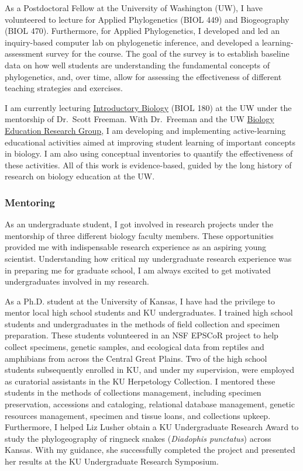 As a Postdoctoral Fellow at the University of Washington (UW), I have
volunteered to lecture for Applied Phylogenetics (BIOL 449) and Biogeography
(BIOL 470).
Furthermore, for Applied Phylogenetics, I developed and led an inquiry-based
computer lab on phylogenetic inference, and developed a learning-assessment
survey for the course.
The goal of the survey is to establish baseline data on how well students are
understanding the fundamental concepts of phylogenetics, and, over time, allow
for assessing the effectiveness of different teaching strategies and exercises.

I am currently lecturing
\href{http://courses.biology.washington.edu/biol180/}{Introductory Biology}
(BIOL 180) at the UW under the mentorship of Dr.\ Scott Freeman.
With Dr.\ Freeman and the UW \href{http://uw-berg.wikifoundry.com/}{Biology
    Education Research Group}, I am developing and implementing active-learning
educational activities aimed at improving student learning of important
concepts in biology.
I am also using conceptual inventories to quantify the effectiveness of these
activities.
All of this work is evidence-based, guided by the long history of research on
biology education at the UW.

\subsubsection*{Mentoring}
As an undergraduate student, I got involved in research projects under the
mentorship of three different biology faculty members.
These opportunities provided me with indispensable research experience as an
aspiring young scientist.
Understanding how critical my undergraduate research experience was in
preparing me for graduate school, I am always excited to get motivated
undergraduates involved in my research.

As a Ph.D. student at the University of Kansas, I have had the privilege to
mentor local high school students and KU undergraduates.
I trained high school students and undergraduates in the methods of field
collection and specimen preparation.
These students volunteered in an NSF EPSCoR project to help collect specimens,
genetic samples, and ecological data from reptiles and amphibians from across
the Central Great Plains.
Two of the high school students subsequently enrolled in KU, and under my
supervision, were employed as curatorial assistants in the KU Herpetology
Collection.
I mentored these students in the methods of collections management, including
specimen preservation, accessions and cataloging, relational database
management, genetic resources management, specimen and tissue loans, and
collections upkeep.
Furthermore, I helped Liz Lusher obtain a KU Undergraduate Research Award to
study the phylogeography of ringneck snakes (\emph{Diadophis punctatus}) across
Kansas.
With my guidance, she successfully completed the project and presented her
results at the KU Undergraduate Research Symposium.

